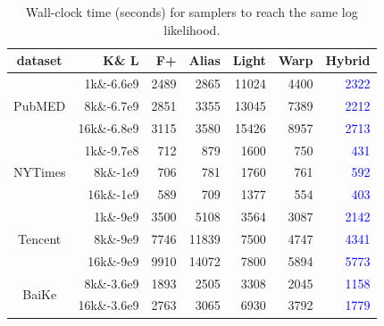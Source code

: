 \documentclass[10pt,journal,cspaper,compsoc]{IEEEtran}
\begin{document}
\begin{table}[t]
	\caption{Wall-clock time (seconds) for samplers to reach the same log likelihood.}
	\begin{tabular}{|c|r|r|r|r|r|r|}
		
		\hline
		\textbf{dataset} & \textbf{K\& L} & \textbf{F+} &\textbf{Alias}
		& \textbf{Light}
		& \textbf{Warp}
		& \textbf{Hybrid}\\
		\hline
		\hline
		\multirow{3}{*}{PubMED} & 1k\&-6.6e9 & 2489  & 2865  & 11024 & 4400 & \textcolor{blue}{2322}\\
		\cline{2-7}
		& 8k\&-6.7e9 & 2851  & 3355 & 13045 & 7389 & \textcolor{blue}{2212} \\
		\cline{2-7}
		& 16k\&-6.8e9 & 3115  & 3580 & 15426 & 8957 & \textcolor{blue}{2713}\\
		\hline
		\hline
		\multirow{3}{*}{NYTimes}& 1k\&-9.7e8 & 712   & 879  & 1600   & 750 & \textcolor{blue}{431}\\
		\cline{2-7}
		& 8k\&-1e9 & 706 & 781  & 1760 & 761 & \textcolor{blue}{592} \\
		\cline{2-7}
		& 16k\&-1e9  & 589  & 709   & 1377 & 554 & \textcolor{blue}{403}\\
		\hline
		\hline
		\multirow{3}{*}{Tencent} & 1k\&-9e9 & 3500  & 5108   & 3564 & 3087 & \textcolor{blue}{2142}\\
		\cline{2-7}
		&8k\&-9e9 & 7746  & 11839   & 7500 & 4747 & \textcolor{blue}{4341}\\
		\cline{2-7}
		&16k\&-9e9 & 9910 & 14072   & 7800 & 5894 & \textcolor{blue}{5773}\\
		\hline
		\hline
		\multirow{2}{*}{BaiKe} & 8k\&-3.6e9 & 1893  & 2505   &  3308& 2045 & \textcolor{blue}{1158}\\
		\cline{2-7}
		& 16k\&-3.6e9 & 2763  &  3065  & 6930 & 3792 & \textcolor{blue}{1779}\\
		\hline
	\end{tabular}
	\label{tb:wall_time}
\end{table}
\end{document}
